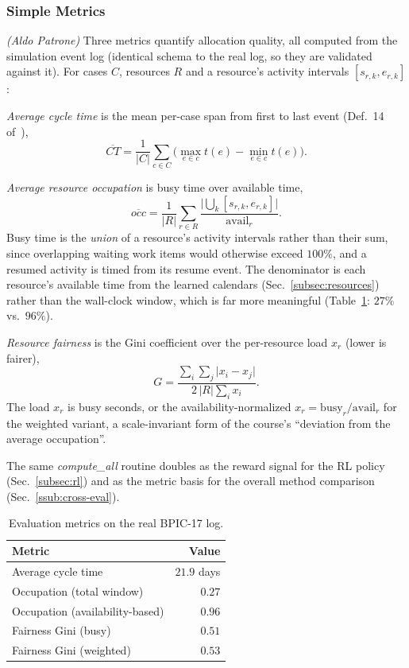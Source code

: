 \subsubsection{Simple Metrics}\label{ssub:metrics}
\textit{(Aldo Patrone)}\quad
Three metrics quantify allocation quality, all computed from the simulation event log
(identical schema to the real log, so they are validated against it). For cases $C$,
resources $R$ and a resource's activity intervals $[s_{r,k},e_{r,k}]$:

\emph{Average cycle time} is the mean per-case span from first to last event
(Def.~14 of~\cite{middelhuis2025rl}),
\[
\overline{CT}=\frac{1}{|C|}\sum_{c\in C}\Big(\max_{e\in c}t(e)-\min_{e\in c}t(e)\Big).
\]

\emph{Average resource occupation} is busy time over available time,
\[
\overline{occ}=\frac{1}{|R|}\sum_{r\in R}\frac{\big|\bigcup_k[s_{r,k},e_{r,k}]\big|}{\mathrm{avail}_r}.
\]
Busy time is the \emph{union} of a resource's activity intervals rather than their sum, since
overlapping waiting work items would otherwise exceed $100\%$, and a resumed activity is timed
from its resume event. The denominator is each resource's available time from the learned
calendars (Sec.~\ref{subsec:resources}) rather than the wall-clock window, which is far more
meaningful (Table~\ref{tab:metrics_ref}: $27\%$ vs.\ $96\%$).

\emph{Resource fairness} is the Gini coefficient over the per-resource load $x_r$ (lower is fairer),
\[
G=\frac{\sum_{i}\sum_{j}\lvert x_i-x_j\rvert}{2\,|R|\sum_i x_i}.
\]
The load $x_r$ is busy seconds, or the availability-normalized $x_r=\text{busy}_r/\mathrm{avail}_r$
for the weighted variant, a scale-invariant form of the course's ``deviation from the average
occupation''.

The same \emph{compute\_all} routine doubles as the reward signal for the RL policy
(Sec.~\ref{subsec:rl}) and as the metric basis for the overall method comparison
(Sec.~\ref{ssub:cross-eval}).

\begin{table}[!h]
    \caption{Evaluation metrics on the real BPIC-17 log.}
    \centering
    \renewcommand{\arraystretch}{1.2}
    \begin{tabular}{lr}
        \toprule
        \textbf{Metric} & \textbf{Value} \\
        \midrule
        Average cycle time             & $21.9$ days \\
        Occupation (total window)       & $0.27$ \\
        Occupation (availability-based) & $0.96$ \\
        Fairness Gini (busy)            & $0.51$ \\
        Fairness Gini (weighted)        & $0.53$ \\
        \bottomrule
    \end{tabular}
    \label{tab:metrics_ref}
\end{table}
